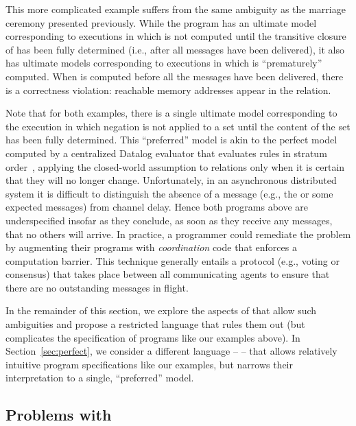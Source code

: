 This more complicated example suffers from the same ambiguity as the marriage
ceremony presented previously.  While the program has an ultimate model
corresponding to executions in which  is not computed until the
transitive closure of  has been fully determined (i.e.,
after all messages have been delivered), it also has ultimate models
corresponding to executions in which  is ``prematurely''
computed.  When  is computed before all the 
messages have been delivered, there is a correctness violation: reachable memory
addresses appear in the  relation.

Note that for both examples, there is a single ultimate model corresponding to
the execution in which negation is not applied to a set until the content of the
set has been fully determined.  This ``preferred'' model is akin to the perfect
model computed by a centralized Datalog evaluator that evaluates rules in
stratum order~\cite{ullmanbook}, applying the closed-world assumption to
relations only when it is certain that they will no longer change.
Unfortunately, in an asynchronous distributed system it is difficult to
distinguish the absence of a message (e.g., the  or some
expected  messages) from channel delay.  Hence both programs
above are underspecified insofar as they conclude, as soon as they receive any
messages, that no others will arrive.  In practice, a programmer could remediate
the problem by augmenting their programs with \emph{coordination} code that
enforces a computation barrier.  This technique generally entails a protocol
(e.g., voting or consensus) that takes place between all communicating agents to
ensure that there are no outstanding messages in flight.

In the remainder of this section, we explore the aspects of \lang that allow
such ambiguities and propose a restricted language \slang that rules them out
(but complicates the specification of programs like our examples above).  In
Section~\ref{sec:perfect}, we consider a different language -- \slang -- that allows
relatively intuitive program specifications like our examples, but narrows their
interpretation to a single, ``preferred'' model.

\subsection{Problems with \large \bf \lang}

